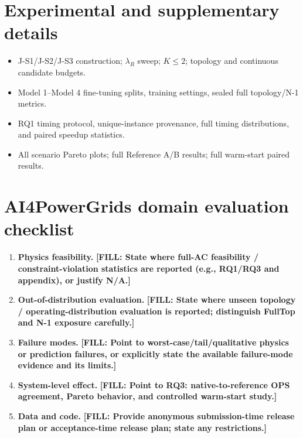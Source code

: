 \documentclass{article}
\newcommand{\fillin}[1]{\textcolor{red!70!black}{\textbf{[FILL: #1]}}}
\newcommand{\draftpoint}[1]{\item \textcolor{black!70}{#1}}
\begin{document}
\section{Experimental and supplementary details}
\begin{itemize}
    \draftpoint{J-S1/J-S2/J-S3 construction; $\lambda_R$ sweep; $K\leq2$; topology and continuous candidate budgets.}
    \draftpoint{Model 1--Model 4 fine-tuning splits, training settings, sealed full topology/N-1 metrics.}
    \draftpoint{RQ1 timing protocol, unique-instance provenance, full timing distributions, and paired speedup statistics.}
    \draftpoint{All scenario Pareto plots; full Reference A/B results; full warm-start paired results.}
\end{itemize}

\section*{AI4PowerGrids domain evaluation checklist}
\begin{enumerate}
    \item \textbf{Physics feasibility.}
    \fillin{State where full-AC feasibility / constraint-violation statistics are reported (e.g., RQ1/RQ3 and appendix), or justify N/A.}

    \item \textbf{Out-of-distribution evaluation.}
    \fillin{State where unseen topology / operating-distribution evaluation is reported; distinguish FullTop and N-1 exposure carefully.}

    \item \textbf{Failure modes.}
    \fillin{Point to worst-case/tail/qualitative physics or prediction failures, or explicitly state the available failure-mode evidence and its limits.}

    \item \textbf{System-level effect.}
    \fillin{Point to RQ3: native-to-reference OPS agreement, Pareto behavior, and controlled warm-start study.}

    \item \textbf{Data and code.}
    \fillin{Provide anonymous submission-time release plan or acceptance-time release plan; state any restrictions.}
\end{enumerate}

\end{document}
